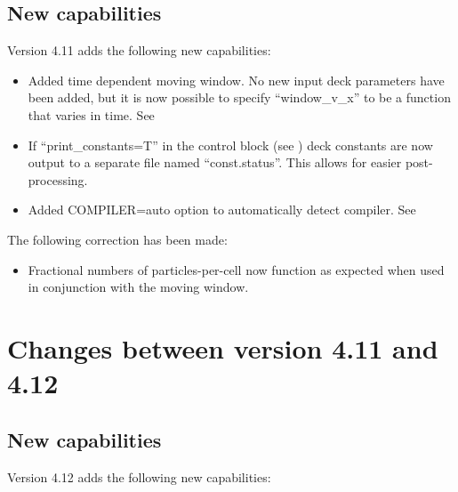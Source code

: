 \subsection{New capabilities}
Version 4.11 adds the following new capabilities:

\begin{itemize}
\item Added time dependent moving window. No new input deck parameters have
    been added, but it is now possible to specify ``window\_v\_x'' to be a
    function that varies in time. See 
\item If ``print\_constants=T'' in the control block (see )
    deck constants are now output to a separate file named ``const.status''.
    This allows for easier post-processing.
\item Added COMPILER=auto option to automatically detect compiler. See
\end{itemize}

The following correction has been made:
\begin{itemize}
\item Fractional numbers of particles-per-cell now function as expected when
used in conjunction with the moving window.
\end{itemize}
\bigskip


\section{Changes between version 4.11 and 4.12}

\subsection{New capabilities}
Version 4.12 adds the following new capabilities:

